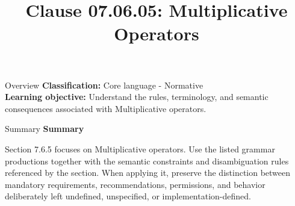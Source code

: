 \documentclass[10pt,letterpaper]{article}
\title{Clause 07.06.05: Multiplicative Operators}
\author{}
\date{}
\begin{document}
\maketitle
\begin{CornellOverviewBox}{Overview}
\textbf{Classification:} Core language - Normative\\[2pt]
\textbf{Learning objective:} Understand the rules, terminology, and semantic consequences associated with Multiplicative operators.
\end{CornellOverviewBox}\begin{CornellSummaryBox}{Summary}
{\sffamily\bfseries\color{Accent} Summary}\par\vspace{3pt}Section 7.6.5 focuses on Multiplicative operators. Use the listed grammar productions together with the semantic constraints and disambiguation rules referenced by the section. When applying it, preserve the distinction between mandatory requirements, recommendations, permissions, and behavior deliberately left undefined, unspecified, or implementation-defined.
\end{CornellSummaryBox}
\end{document}

